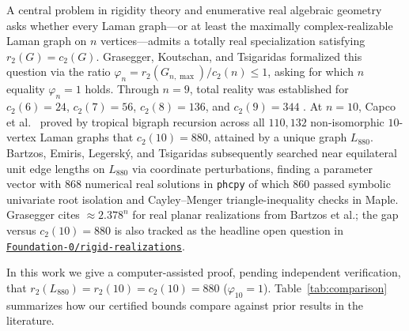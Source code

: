 \documentclass[11pt,a4paper]{article}
\theoremstyle{definition}
\theoremstyle{remark}
\begin{document}
A central problem in rigidity theory and enumerative real algebraic geometry asks whether every Laman graph---or at least the maximally complex-realizable Laman graph on $n$ vertices---admits a totally real specialization satisfying $r_2(G) = c_2(G)$. Grasegger, Koutschan, and Tsigaridas \cite[Open Problem~5]{GKT20} formalized this question via the ratio $\varphi_n = r_2(G_{n,\max}) / c_2(n) \le 1$, asking for which $n$ equality $\varphi_n = 1$ holds. Through $n = 9$, total reality was established for $c_2(6) = 24$, $c_2(7) = 56$, $c_2(8) = 136$, and $c_2(9) = 344$ \cite{BS04,ETV13,BELT18,GKT20}. At $n = 10$, Capco et al.\ \cite[Table~2]{CGGKLS18} proved by tropical bigraph recursion across all $110{,}132$ non-isomorphic $10$-vertex Laman graphs that $c_2(10) = 880$, attained by a unique graph $L_{880}$. Bartzos, Emiris, Legersk\'{y}, and Tsigaridas \cite[Section~5, Table~2]{BELT18} subsequently searched near equilateral unit edge lengths on $L_{880}$ via coordinate perturbations, finding a parameter vector with $868$ numerical real solutions in \texttt{phcpy} of which $860$ passed symbolic univariate root isolation and Cayley--Menger triangle-inequality checks in Maple. Grasegger \cite{Gra25} cites $\approx 2.378^n$ for real planar realizations from Bartzos et al.; the gap versus $c_2(10) = 880$ is also tracked as the headline open question in \href{https://github.com/Foundation-0/rigid-realizations}{\texttt{Foundation-0/rigid-realizations}}.

In this work we give a computer-assisted proof, pending independent verification, that $r_2(L_{880}) = r_2(10) = c_2(10) = 880$ ($\varphi_{10} = 1$). Table~\ref{tab:comparison} summarizes how our certified bounds compare against prior results in the literature.
\end{document}

